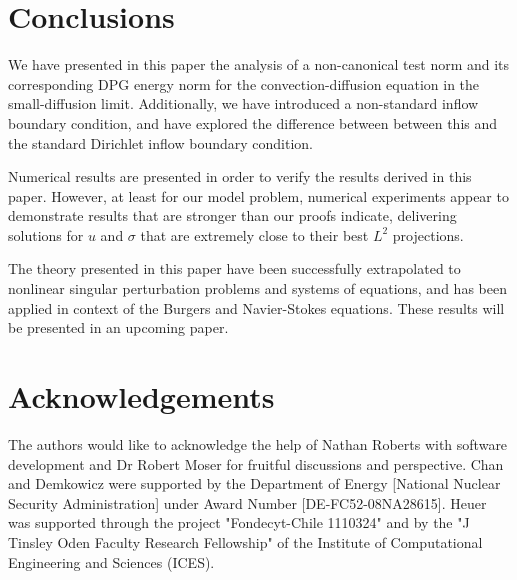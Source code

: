 \documentclass[11pt,onecolumn]{scrartcl}
\begin{document}
\section{Conclusions}

We have presented in this paper the analysis of a non-canonical test norm and its corresponding DPG energy norm for the convection-diffusion equation in the small-diffusion limit. Additionally, we have introduced a non-standard inflow boundary condition, and have explored the difference between between this and the standard Dirichlet inflow boundary condition. 

Numerical results are presented in order to verify the results derived in this paper. However, at least for our model problem, numerical experiments appear to demonstrate results that are stronger than our proofs indicate, delivering solutions for $u$ and $\sigma$ that are extremely close to their best $L^2$ projections. 

The theory presented in this paper have been successfully extrapolated to nonlinear singular perturbation problems and systems of equations, and has been applied in context of the Burgers and Navier-Stokes equations. These results will be presented in an upcoming paper. 
 
\section{Acknowledgements}

The authors would like to acknowledge the help of Nathan Roberts with software development and Dr Robert Moser for fruitful discussions and perspective. Chan and Demkowicz were supported by the Department of Energy [National Nuclear Security Administration] under Award Number [DE-FC52-08NA28615]. Heuer was supported through the project "Fondecyt-Chile 1110324" and by the "J Tinsley Oden Faculty Research Fellowship" of the Institute of Computational Engineering and Sciences (ICES).

 




\end{document}
